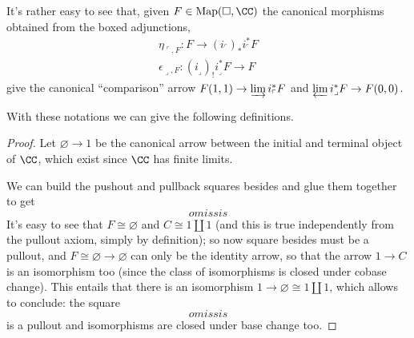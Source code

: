It's rather easy to see that, given $F\in \text{Map}(\square, \CC)$ the canonical morphisms obtained from the boxed adjunctions,
\begin{gather*}
\eta_{\ulcorner, F}\colon F\to (i_\ulcorner)_*i_\ulcorner^* F\\
\epsilon_{\lrcorner, F}\colon (i_\lrcorner)_!  i_\lrcorner^*F\to F
\end{gather*}
give the canonical ``comparison'' arrow $F(1,1) \to \varinjlim i_\ulcorner^* F$ and $\varprojlim i_\lrcorner^*F\to F(0,0)$.

With these notations we can give the following definitions.

\hrulefill

\begin{proof}
Let $\varnothing\to 1$ be the canonical arrow between the initial and terminal object of $\CC$, which exist since $\CC$ has finite limits.

We can build the pushout and pullback squares besides 
and glue them together to get 
\[omissis
\]
It's easy to see that $F\cong \varnothing$ and $C\cong 1\amalg 1$ (and this is true independently from the pullout axiom, simply by definition); so now square  besides must be a pullout, and $F\cong\varnothing\to\varnothing$ can only be the identity arrow, so that the arrow $1\to C$ is an isomorphism too (since the class of isomorphisms is closed under cobase change). This entails that there is an isomorphism $1\to\varnothing\cong 1\amalg 1$, which allows to conclude: the square
\[
omissis
\]
is a pullout and isomorphisms are closed under base change too.


\end{proof}
